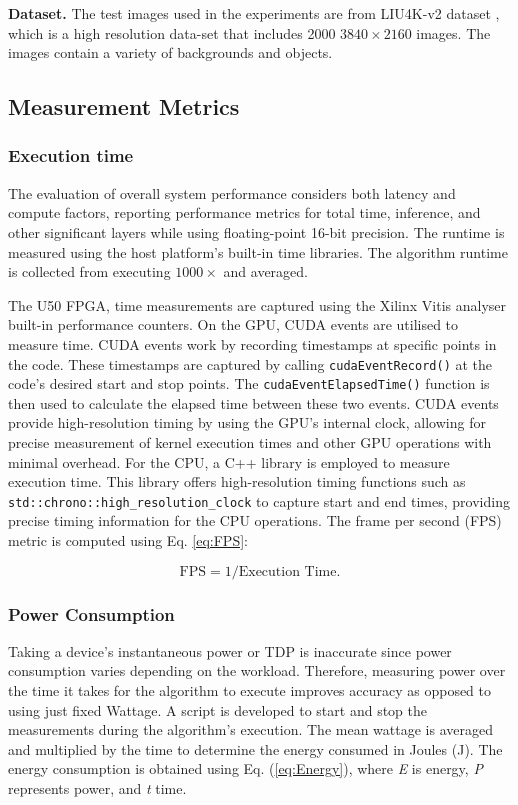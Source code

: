 \documentclass[]{spie}  %
\begin{document}
\textbf{Dataset.} The test images used in the experiments are from LIU4K-v2 dataset \cite{LiuliuYan19}, which is a high resolution data-set that includes 2000 $3840\times2160$ images. The images contain a variety of backgrounds and objects. 


\subsection{Measurement Metrics}
\subsubsection{Execution time}
The evaluation of overall system performance considers both latency and compute factors, reporting performance metrics for total time, inference, and other significant layers while using floating-point 16-bit precision. The runtime is measured using the host platform's built-in time libraries. The algorithm runtime is collected from executing $1000\times$ and averaged.  

The U50 FPGA, time measurements are captured using the Xilinx Vitis analyser built-in performance counters. On the GPU, CUDA events are utilised to measure time. CUDA events work by recording timestamps at specific points in the code. These timestamps are captured by calling \verb|cudaEventRecord()| at the code's desired start and stop points. The \verb|cudaEventElapsedTime()| function is then used to calculate the elapsed time between these two events. CUDA events provide high-resolution timing by using the GPU's internal clock, allowing for precise measurement of kernel execution times and other GPU operations with minimal overhead. For the CPU, a C++ library is employed to measure execution time. This library offers high-resolution timing functions such as \verb|std::chrono::high_resolution_clock| to capture start and end times, providing precise timing information for the CPU operations. The frame per second (FPS) metric is computed using Eq. \ref{eq:FPS}: 

\begin{equation}\label{eq:FPS}
\text{FPS}= 1/\text{Execution Time}.
\end{equation}

\subsubsection{Power Consumption}

Taking a device's instantaneous power or TDP is inaccurate since power consumption varies depending on the workload. Therefore, measuring power over the time it takes for the algorithm to execute improves accuracy as opposed to using just fixed Wattage. A script is developed to start and stop the measurements during the algorithm's execution. The mean wattage is averaged and multiplied by the time to determine the energy consumed in Joules (J). The energy consumption is obtained using Eq. (\ref{eq:Energy}), where \textit{E} is energy, \textit{P} represents power, and \textit{t} time.
\end{document}
